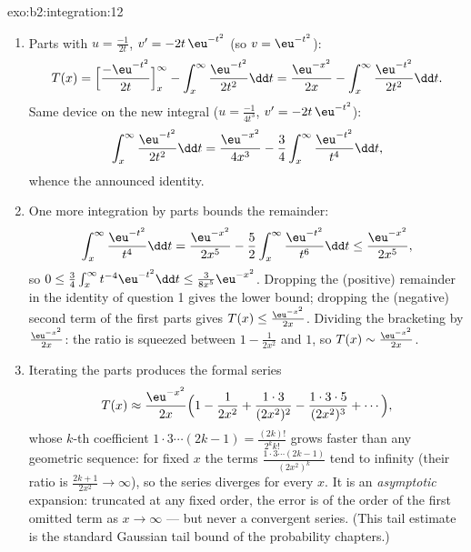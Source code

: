 \begin{solution}{exo:b2:integration:12}
\begin{enumerate}
  \item Parts with $u = \frac{-1}{2t}$, $v' = -2t\,\eu^{-t^2}$
        (so $v = \eu^{-t^2}$):
        \[
        T(x) = \Bigl[\frac{-\eu^{-t^2}}{2t}\Bigr]_x^\infty
        - \int_x^\infty \frac{\eu^{-t^2}}{2t^2}\dd t
        = \frac{\eu^{-x^2}}{2x}
        - \int_x^\infty \frac{\eu^{-t^2}}{2t^2}\dd t .
        \]
        Same device on the new integral ($u = \frac{-1}{4t^3}$,
        $v' = -2t\,\eu^{-t^2}$):
        \[
        \int_x^\infty \frac{\eu^{-t^2}}{2t^2}\dd t
        = \frac{\eu^{-x^2}}{4x^3}
        - \frac34\int_x^\infty \frac{\eu^{-t^2}}{t^4}\dd t ,
        \]
        whence the announced identity.
  \item One more integration by parts bounds the remainder:
        \[
        \int_x^\infty \frac{\eu^{-t^2}}{t^4}\dd t
        = \frac{\eu^{-x^2}}{2x^5}
        - \frac52\int_x^\infty\frac{\eu^{-t^2}}{t^6}\dd t
        \leq \frac{\eu^{-x^2}}{2x^5},
        \]
        so $0 \leq \frac34\int_x^\infty t^{-4}\eu^{-t^2}\dd t
        \leq \frac{3}{8x^5}\eu^{-x^2}$. Dropping the (positive)
        remainder in the identity of question 1 gives the lower
        bound; dropping the (negative) second term of the first
        parts gives $T(x) \leq \frac{\eu^{-x^2}}{2x}$. Dividing
        the bracketing by $\frac{\eu^{-x^2}}{2x}$: the ratio is
        squeezed between $1 - \frac{1}{2x^2}$ and $1$, so $T(x)
        \sim \frac{\eu^{-x^2}}{2x}$.
  \item Iterating the parts produces the formal series
        \[
        T(x) \approx \frac{\eu^{-x^2}}{2x}\Bigl(1 -
        \frac{1}{2x^2} + \frac{1\cdot3}{(2x^2)^2} -
        \frac{1\cdot3\cdot5}{(2x^2)^3} + \cdots\Bigr),
        \]
        whose $k$-th coefficient $1\cdot3\cdots(2k-1) =
        \frac{(2k)!}{2^k k!}$ grows faster than any geometric
        sequence: for fixed $x$ the terms
        $\frac{1\cdot3\cdots(2k-1)}{(2x^2)^k}$ tend to infinity
        (their ratio is $\frac{2k+1}{2x^2} \to \infty$), so the
        series diverges for every $x$. It is an
        \emph{asymptotic} expansion: truncated at any fixed
        order, the error is of the order of the first omitted
        term as $x \to \infty$ --- but never a convergent
        series. (This tail estimate is the standard Gaussian
        tail bound of the probability chapters.)
\end{enumerate}
\end{solution}

